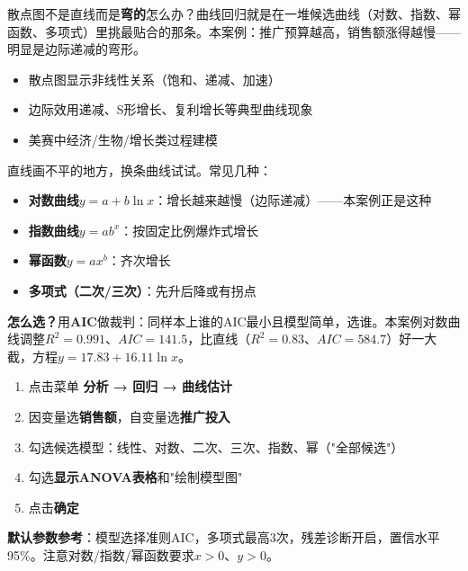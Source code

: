 \begin{algointro}
散点图不是直线而是\textbf{弯的}怎么办？曲线回归就是在一堆候选曲线（对数、指数、幂函数、多项式）里挑最贴合的那条。本案例：推广预算越高，销售额涨得越慢——明显是边际递减的弯形。
\end{algointro}

\begin{algoscene}
\begin{itemize}
    \item 散点图显示非线性关系（饱和、递减、加速）
    \item 边际效用递减、S形增长、复利增长等典型曲线现象
    \item 美赛中经济/生物/增长类过程建模
\end{itemize}
\end{algoscene}

\begin{algoprinciple}
直线画不平的地方，换条曲线试试。常见几种：
\begin{itemize}
    \item \textbf{对数曲线}$y=a+b\ln x$：增长越来越慢（边际递减）——本案例正是这种
    \item \textbf{指数曲线}$y=ab^x$：按固定比例爆炸式增长
    \item \textbf{幂函数}$y=ax^b$：齐次增长
    \item \textbf{多项式（二次/三次）}：先升后降或有拐点
\end{itemize}

\textbf{怎么选？}用\textbf{AIC}做裁判：同样本上谁的AIC最小且模型简单，选谁。本案例对数曲线调整$R^2=0.991$、$AIC=141.5$，比直线（$R^2=0.83$、$AIC=584.7$）好一大截，方程$y=17.83+16.11\ln x$。
\end{algoprinciple}

\begin{algosposs}
\begin{enumerate}
    \item 点击菜单 \textbf{分析 → 回归 → 曲线估计}
    \item 因变量选\textbf{销售额}，自变量选\textbf{推广投入}
    \item 勾选候选模型：线性、对数、二次、三次、指数、幂（"全部候选"）
    \item 勾选\textbf{显示ANOVA表格}和"绘制模型图"
    \item 点击\textbf{确定}
\end{enumerate}

\textbf{默认参数参考}：模型选择准则AIC，多项式最高3次，残差诊断开启，置信水平95\%。注意对数/指数/幂函数要求$x>0$、$y>0$。
\end{algosposs}

